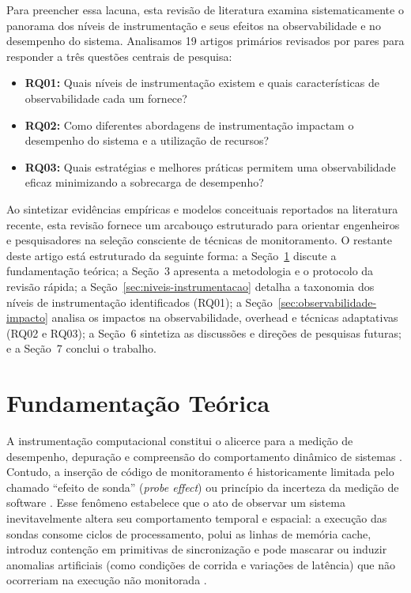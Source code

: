 \documentclass[sigconf, anonymous]{acmart}
\begin{document}
Para preencher essa lacuna, esta revisão de literatura examina sistematicamente o panorama dos níveis de instrumentação e seus efeitos na observabilidade e no desempenho do sistema. Analisamos 19 artigos primários revisados por pares para responder a três questões centrais de pesquisa:
\begin{itemize}
    \item \textbf{RQ01:} Quais níveis de instrumentação existem e quais características de observabilidade cada um fornece?
    \item \textbf{RQ02:} Como diferentes abordagens de instrumentação impactam o desempenho do sistema e a utilização de recursos?
    \item \textbf{RQ03:} Quais estratégias e melhores práticas permitem uma observabilidade eficaz minimizando a sobrecarga de desempenho?
\end{itemize}

Ao sintetizar evidências empíricas e modelos conceituais reportados na literatura recente, esta revisão fornece um arcabouço estruturado para orientar engenheiros e pesquisadores na seleção consciente de técnicas de monitoramento. O restante deste artigo está estruturado da seguinte forma: a Seção~\ref{sec:fund-teorica} discute a fundamentação teórica; a Seção~3 apresenta a metodologia e o protocolo da revisão rápida; a Seção~\ref{sec:niveis-instrumentacao} detalha a taxonomia dos níveis de instrumentação identificados (RQ01); a Seção~\ref{sec:observabilidade-impacto} analisa os impactos na observabilidade, overhead e técnicas adaptativas (RQ02 e RQ03); a Seção~6 sintetiza as discussões e direções de pesquisas futuras; e a Seção~7 conclui o trabalho.

\section{Fundamentação Teórica}
\label{sec:fund-teorica}

A instrumentação computacional constitui o alicerce para a medição de desempenho, depuração e compreensão do comportamento dinâmico de sistemas \cite{waheed_instrumentation}. Contudo, a inserção de código de monitoramento é historicamente limitada pelo chamado ``efeito de sonda'' (\textit{probe effect}) ou princípio da incerteza da medição de software \cite{sivasubramaniam_1994, garcia_2000}. Esse fenômeno estabelece que o ato de observar um sistema inevitavelmente altera seu comportamento temporal e espacial: a execução das sondas consome ciclos de processamento, polui as linhas de memória cache, introduz contenção em primitivas de sincronização e pode mascarar ou induzir anomalias artificiais (como condições de corrida e variações de latência) que não ocorreriam na execução não monitorada \cite{sivasubramaniam_1994}.
\end{document}
